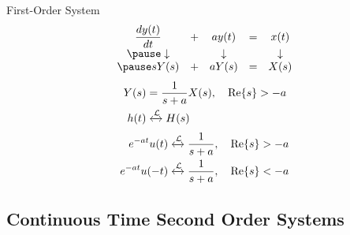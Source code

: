 \begin{frame}{First-Order System}
    \begin{equation*}
        \begin{matrix}
            \dfrac{dy(t)}{dt} & +& ay(t) &= &x(t)\\
            \pause
            \downarrow &&\downarrow &&\downarrow\\
            \pause
            sY(s) & +& aY(s) &= &X(s)\\
        \end{matrix}
    \end{equation*}
    \pause
{}
{
    \begin{align*}
        Y(s) &= \dfrac{1}{s+a}X(s), \quad \mathrm{Re}\{s\}> -a\\
        h(t) &\xleftrightarrow{\mathcal{L}} H(s)
    \end{align*}
    \pause
    \begin{align*}
        e^{-at}u(t) &\xleftrightarrow{\mathcal{L}} \dfrac{1}{s+a}, \quad \mathrm{Re}\{s\}>-a\\
        e^{-at}u(-t) &\xleftrightarrow{\mathcal{L}} \dfrac{1}{s+a}, \quad \mathrm{Re}\{s\}<-a
    \end{align*}
}
\end{frame}

\subsection{Continuous Time Second Order Systems}

